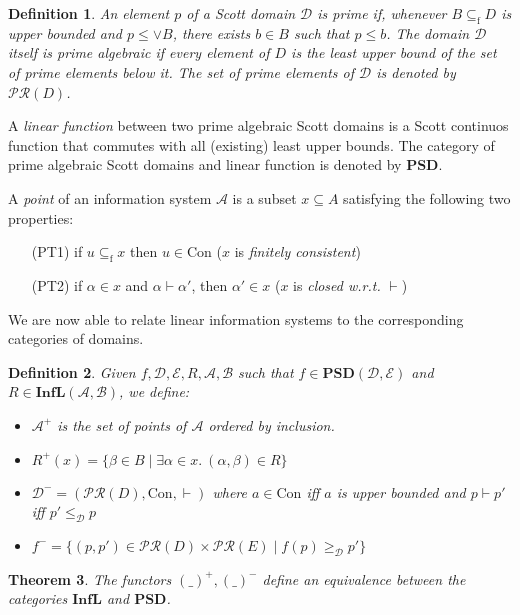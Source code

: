 \documentclass[copyright,creativecommons]{eptcs}
\newcommand{\Prime}[1]{\mathcal{P}\mathcal{R}(#1)}
\newtheorem{theorem}{Theorem}
\newtheorem{definition}[theorem]{Definition}
\newcommand{\cA}{\mathcal{A}}
\newcommand{\cB}{\mathcal{B}}
\newcommand{\cD}{\mathcal{D}}
\newcommand{\cE}{\mathcal{E}}
\newcommand{\rf}{\mathrm{f}}
\newcommand{\Psd}{\mathbf{PSD}} \newcommand{\Sd}{\mathbf{SD}} \newcommand{\Palglat}{\mathbf{PAL}} \newcommand{\Cpo}{\mathbf{Cpo}} \newcommand{\Inf}{\mathbf{Inf}} \newcommand{\Inflfull}{\mathbf{InfLFull}} \newcommand{\Scottl}{\mathbf{ScottL}} \newcommand{\Rel}{\mathbf{Rel}} \newcommand{\Infl}{\mathbf{InfL}} \newcommand{\Cl}{Cl}
\newcommand{\Con}{\mathrm{Con}} \newcommand{\Com}{\mathrm{Com}} \newcommand{\Sup}{\mathrm{Sup}} %
\begin{document}
\begin{definition}
An element $p$ of a Scott domain $\cD$ is \emph{prime} if, whenever $B \subseteq_\rf D$ is upper bounded and $p \leq \vee B$, there exists $b \in B$ such that $p \leq b$. The domain $\cD$ itself is \emph{prime algebraic} if every element of $D$ is the least upper bound of the set of prime elements below it. The set of prime elements of $\cD$ is denoted by $\Prime{D}$.
\end{definition}

A \emph{linear function} between two prime algebraic Scott domains is a Scott continuos function that commutes with all (existing) least upper bounds. The category of prime algebraic Scott domains and linear function is denoted by $\Psd$.

\newpage

A \emph{point} of an information system $\cA$ is a subset $x \subseteq A$ satisfying the following two properties:
\begin{itemize}
\item[(PT1)] if $u \subseteq_\rf x$ then $u \in \Con$ ($x$ is \emph{finitely consistent})
\item[(PT2)] if $\alpha\in x$ and $\alpha \vdash \alpha'$, then $\alpha' \in x$ ($x$ is \emph{closed w.r.t.} $\vdash$)
\end{itemize}

We are now able to relate linear information systems to the corresponding categories of domains.

\begin{definition}\label{functors-for-equivalence}
Given $f,\cD,\cE, R ,\cA, \cB$ such that $f \in \Psd(\cD,\cE)$ and $R \in \Infl(\cA, \cB)$, we define:
\begin{itemize}
\item $\cA^+$ is the set of points of $\cA$ ordered by inclusion.

\item $R^+(x) = \{\beta \in B \mid \exists \alpha \in x.\ (\alpha,\beta)\in R\}$

\item $\cD^- = (\Prime{D},\Con,\vdash)$ where 
$a \in \Con$ iff $a$ is upper bounded and $p \vdash p'$ iff $p'\leq_\cD p$

\item $f^- = \{(p,p') \in \Prime{D} \times \Prime{E} \mid f(p) \geq_\cD p'\}$
\end{itemize}
\end{definition}

\begin{theorem}\label{equivalence}
The functors $(\_ )^+,(\_ )^-$ define an equivalence between the categories $\Infl$ and $\Psd$.
\end{theorem}
\end{document}
